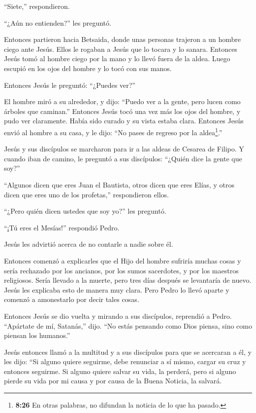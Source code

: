 ``Siete,'' respondieron.

 ``¿Aún no entienden?'' les preguntó.

 Entonces partieron hacia Betsaida, donde unas personas
trajeron a un hombre ciego ante Jesús. Ellos le rogaban a Jesús que lo
tocara y lo sanara.  Entonces Jesús tomó al hombre ciego
por la mano y lo llevó fuera de la aldea. Luego escupió en los ojos del
hombre y lo tocó con sus manos.

Entonces Jesús le preguntó: ``¿Puedes ver?''

 El hombre miró a su alrededor, y dijo: ``Puedo ver a la
gente, pero lucen como árboles que caminan.''  Entonces
Jesús tocó una vez más los ojos del hombre, y pudo ver claramente. Había
sido curado y su vista estaba clara.  Entonces Jesús envió
al hombre a su casa, y le dijo: ``No pases de regreso por la
aldea\footnote{\textbf{8:26} En otras palabras, no difundan la noticia
  de lo que ha pasado.}.''

 Jesús y sus discípulos se marcharon para ir a las aldeas
de Cesarea de Filipo. Y cuando iban de camino, le preguntó a sus
discípulos: ``¿Quién dice la gente que soy?''

 ``Algunos dicen que eres Juan el Bautista, otros dicen que
eres Elías, y otros dicen que eres uno de los profetas,'' respondieron
ellos.

 ``¿Pero quién dicen ustedes que soy yo?'' les preguntó.

``¡Tú eres el Mesías!'' respondió Pedro.

 Jesús les advirtió acerca de no contarle a nadie sobre él.

 Entonces comenzó a explicarles que el Hijo del hombre
sufriría muchas cosas y sería rechazado por los ancianos, por los sumos
sacerdotes, y por los maestros religiosos. Sería llevado a la muerte,
pero tres días después se levantaría de nuevo.  Jesús les
explicaba esto de manera muy clara. Pero Pedro lo llevó aparte y comenzó
a amonestarlo por decir tales cosas.

 Entonces Jesús se dio vuelta y mirando a sus discípulos,
reprendió a Pedro. ``Apártate de mí, Satanás,'' dijo. ``No estás
pensando como Dios piensa, sino como piensan los humanos.''

 Jesús entonces llamó a la multitud y a sus discípulos para
que se acercaran a él, y les dijo: ``Si alguno quiere seguirme, debe
renunciar a sí mismo, cargar su cruz y entonces seguirme. 
Si alguno quiere salvar su vida, la perderá, pero si alguno pierde su
vida por mi causa y por causa de la Buena Noticia, la salvará.

